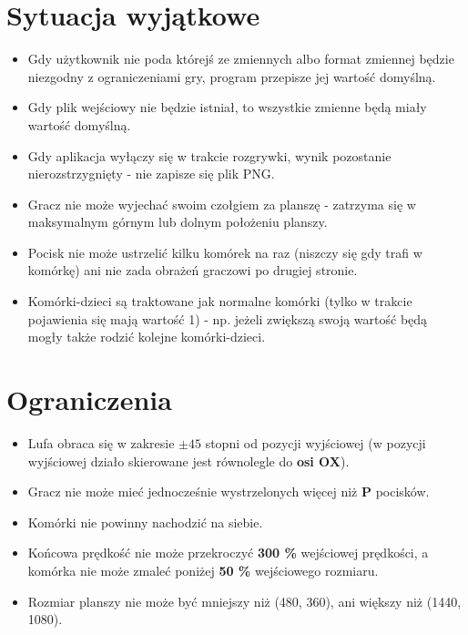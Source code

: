 \documentclass{article}
\begin{document}
\section{Sytuacja wyjątkowe}
\begin{itemize}
    \item Gdy użytkownik nie poda którejś ze zmiennych albo format zmiennej będzie niezgodny z ograniczeniami gry, program przepisze jej wartość domyślną.
    
    \item Gdy plik wejściowy nie będzie istniał, to wszystkie zmienne będą miały wartość domyślną.
    
    \item Gdy aplikacja wyłączy się w trakcie rozgrywki, wynik pozostanie nierozstrzygnięty - nie zapisze się plik PNG.
    
    \item Gracz nie może wyjechać swoim czołgiem za planszę - zatrzyma się w maksymalnym górnym lub dolnym położeniu planszy.
    
    \item Pocisk nie może ustrzelić kilku komórek na raz (niszczy się gdy trafi w komórkę) ani nie zada obrażeń graczowi po drugiej stronie.
    
    \item Komórki-dzieci są traktowane jak normalne komórki (tylko w trakcie pojawienia się mają wartość 1) - np. jeżeli zwiększą swoją wartość będą mogły także rodzić kolejne komórki-dzieci.
    
    
\end{itemize}

\section{Ograniczenia}

    \begin{itemize}
        \item Lufa obraca się w  zakresie $ \pm 45$ stopni od pozycji wyjściowej (w pozycji wyjściowej działo skierowane jest równolegle do \textbf{osi OX}).
        
        \item Gracz nie może mieć jednocześnie wystrzelonych więcej niż \textbf{P} pocisków.
    
        \item Komórki nie powinny nachodzić na siebie. 
    
        \item Końcowa prędkość nie może przekroczyć \textbf{300 \%} wejściowej prędkości, a komórka nie może zmaleć poniżej \textbf{50 \%} wejściowego rozmiaru. 
        
        \item Rozmiar planszy nie może być mniejszy niż (480, 360), ani większy niż (1440, 1080).
    \end{itemize}
  
\end{document}
